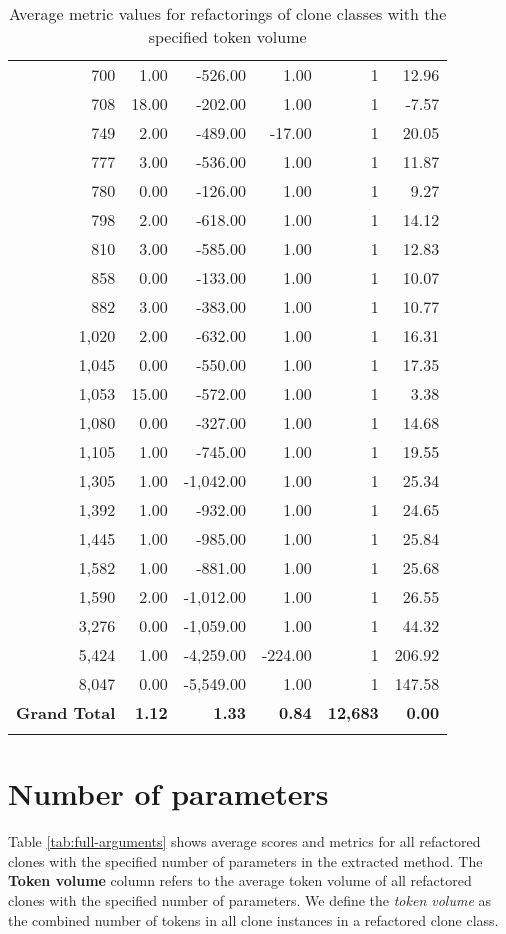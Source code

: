 \begin{appendices}
\begin{longtable}[c]{@{}rrrrrr@{}}
700 & 1.00 & -526.00 & 1.00 & 1 & 12.96 \\
708 & 18.00 & -202.00 & 1.00 & 1 & -7.57 \\
749 & 2.00 & -489.00 & -17.00 & 1 & 20.05 \\
777 & 3.00 & -536.00 & 1.00 & 1 & 11.87 \\
780 & 0.00 & -126.00 & 1.00 & 1 & 9.27 \\
798 & 2.00 & -618.00 & 1.00 & 1 & 14.12 \\
810 & 3.00 & -585.00 & 1.00 & 1 & 12.83 \\
858 & 0.00 & -133.00 & 1.00 & 1 & 10.07 \\
882 & 3.00 & -383.00 & 1.00 & 1 & 10.77 \\
1,020 & 2.00 & -632.00 & 1.00 & 1 & 16.31 \\
1,045 & 0.00 & -550.00 & 1.00 & 1 & 17.35 \\
1,053 & 15.00 & -572.00 & 1.00 & 1 & 3.38 \\
1,080 & 0.00 & -327.00 & 1.00 & 1 & 14.68 \\
1,105 & 1.00 & -745.00 & 1.00 & 1 & 19.55 \\
1,305 & 1.00 & -1,042.00 & 1.00 & 1 & 25.34 \\
1,392 & 1.00 & -932.00 & 1.00 & 1 & 24.65 \\
1,445 & 1.00 & -985.00 & 1.00 & 1 & 25.84 \\
1,582 & 1.00 & -881.00 & 1.00 & 1 & 25.68 \\
1,590 & 2.00 & -1,012.00 & 1.00 & 1 & 26.55 \\
3,276 & 0.00 & -1,059.00 & 1.00 & 1 & 44.32 \\
5,424 & 1.00 & -4,259.00 & -224.00 & 1 & 206.92 \\
8,047 & 0.00 & -5,549.00 & 1.00 & 1 & 147.58 \\* \midrule
\multicolumn{1}{l}{\textbf{Grand Total}} & \textbf{1.12} & \textbf{1.33} & \textbf{0.84} & \textbf{12,683} & \textbf{0.00} \\* \bottomrule
\caption{Average metric values for refactorings of clone classes with the specified token volume}
\label{tab:full-tokenvolume}\\
\end{longtable}

\section{Number of parameters}
Table \ref{tab:full-arguments} shows average scores and metrics for all refactored clones with the specified number of parameters in the extracted method. The \textbf{Token volume} column refers to the average token volume of all refactored clones with the specified number of parameters. We define the \textit{token volume} as the combined number of tokens in all clone instances in a refactored clone class.


\end{appendices}
